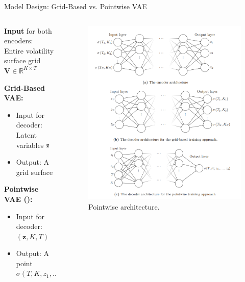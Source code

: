 \documentclass{beamer}
\begin{document}
\begin{frame}{Model Design: Grid-Based vs. Pointwise VAE}
\begin{columns}
    \begin{column}{0.6\textwidth}
\textbf{Input} for both encoders: \\ Entire volatility surface grid \(\mathbf{V} \in \mathbb{R}^{K \times T}\)
\vspace{0.3cm}

\textbf{Grid-Based VAE:}
\begin{itemize}
    \item Input for decoder: Latent variables $\bf{z}$
    \item Output: A grid surface
\end{itemize}
\textbf{Pointwise VAE (\citet{vaeorigin}):}
\begin{itemize}
    \item Input for decoder: $ (\mathbf{z}, K, T) $
    \item Output: A point $\sigma(T,K,z_1,...z_d)$
\end{itemize}
  \end{column}
  \begin{column}{0.4\textwidth}
    \begin{figure}
\includegraphics[width=\textwidth]{docs/slides/img/vae_vol.png}
\caption{Pointwise architecture.}
\end{figure}
  \end{column}
\end{columns}
\end{frame}
\end{document}
